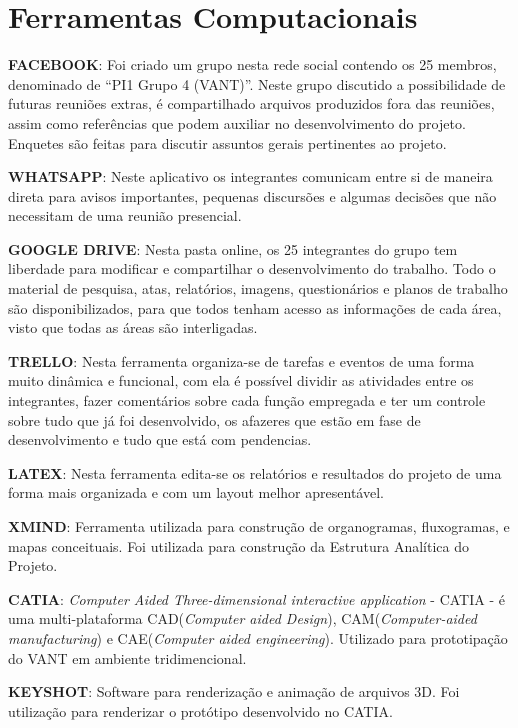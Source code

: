\section{Ferramentas Computacionais}

\textbf{FACEBOOK}:
Foi criado um grupo nesta rede social contendo os 25 membros, denominado de “PI1 Grupo 4 (VANT)”. Neste grupo discutido a possibilidade de futuras reuniões extras, é compartilhado arquivos produzidos fora das reuniões, assim como referências que podem auxiliar no desenvolvimento do projeto. Enquetes são feitas para discutir assuntos gerais pertinentes ao projeto. 

\textbf{WHATSAPP}: 
Neste aplicativo os integrantes comunicam entre si de maneira direta para avisos importantes, pequenas discursões e algumas decisões que não necessitam de uma reunião presencial.

\textbf{GOOGLE DRIVE}: 
Nesta pasta online, os 25 integrantes do grupo tem liberdade para modificar e compartilhar o desenvolvimento do trabalho. Todo o material de pesquisa, atas, relatórios, imagens, questionários e planos de trabalho são disponibilizados, para que todos tenham acesso as informações de cada área, visto que todas as áreas são interligadas.

\textbf{TRELLO}:
Nesta ferramenta organiza-se de tarefas e eventos de uma forma muito dinâmica e funcional, com ela é possível dividir as atividades entre os integrantes, fazer comentários sobre cada função empregada e ter um controle sobre tudo que já foi desenvolvido, os afazeres que estão em fase de desenvolvimento e tudo que está com pendencias.

\textbf{LATEX}:
Nesta ferramenta edita-se os relatórios e resultados do projeto de uma forma mais organizada e com um layout melhor apresentável.


\textbf{XMIND}: Ferramenta utilizada para construção de organogramas, fluxogramas, e mapas conceituais. Foi utilizada para construção da Estrutura Analítica do Projeto.

\textbf{CATIA}:
\textit{Computer Aided Three-dimensional interactive application} - CATIA - é uma multi-plataforma CAD(\textit{Computer aided Design}), CAM(\textit{Computer-aided manufacturing}) e CAE(\textit{Computer aided engineering}). Utilizado para prototipação do VANT em ambiente tridimencional.

\textbf{KEYSHOT}:
Software para renderização e animação de arquivos 3D. Foi utilização para renderizar o protótipo desenvolvido no CATIA.

